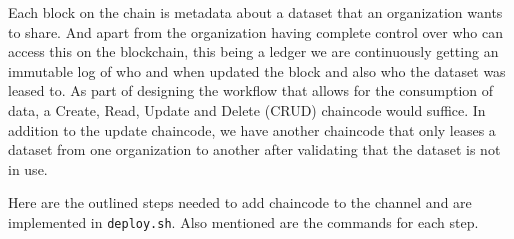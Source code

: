 \bigskip
Each block on the chain is metadata about a dataset that an organization wants to share. And apart from the organization having complete control over who can access this on the blockchain, this being a ledger we are continuously getting an immutable log of who and when updated the block and also who the dataset was leased to. As part of designing the workflow that allows for the consumption of data, a Create, Read, Update and Delete (CRUD) chaincode would suffice. In addition to the update chaincode, we have another chaincode that only leases a dataset from one organization to another after validating that the dataset is not in use. 

\bigskip
Here are the outlined steps needed to add chaincode to the channel and are implemented in \lstinline{deploy.sh}. Also mentioned are the commands for each step.


